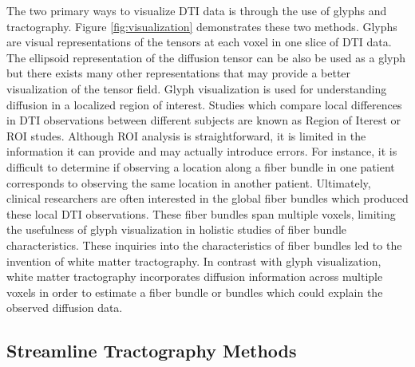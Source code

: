 The two primary ways to visualize DTI data is through the use of glyphs and tractography.  Figure \ref{fig:visualization} demonstrates these two methods.  Glyphs are visual representations of the tensors at each voxel in one slice of DTI data.  The ellipsoid representation of the diffusion tensor can be also be used as a glyph but there exists many other representations that may provide a better visualization of the tensor field.  Glyph visualization is used for understanding diffusion in a localized region of interest.  Studies which compare local differences in DTI observations between different subjects are known as Region of Iterest or ROI studes. Although ROI analysis is straightforward, it is limited in the information it can provide and may actually introduce errors.  For instance, it is difficult to determine if observing a location along a fiber bundle in one patient corresponds to observing the same location in another patient.  Ultimately, clinical researchers are often interested in the global fiber bundles which produced these local DTI observations.  These fiber bundles span multiple voxels, limiting the usefulness of glyph visualization in holistic studies of fiber bundle characteristics.  These inquiries into the characteristics of fiber bundles led to the invention of white matter tractography.  In contrast with glyph visualization, white matter tractography incorporates diffusion information across multiple voxels in order to estimate a fiber bundle or bundles which could explain the observed diffusion data.

\subsection{Streamline Tractography Methods}

